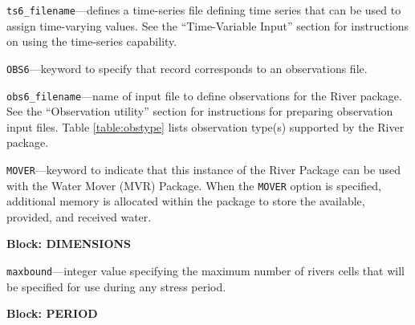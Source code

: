\begin{description}
\item \texttt{ts6\_filename}---defines a time-series file defining time series that can be used to assign time-varying values. See the ``Time-Variable Input'' section for instructions on using the time-series capability.

\item \texttt{OBS6}---keyword to specify that record corresponds to an observations file.

\item \texttt{obs6\_filename}---name of input file to define observations for the River package. See the ``Observation utility'' section for instructions for preparing observation input files. Table \ref{table:obstype} lists observation type(s) supported by the River package.

\item \texttt{MOVER}---keyword to indicate that this instance of the River Package can be used with the Water Mover (MVR) Package.  When the \texttt{MOVER} option is specified, additional memory is allocated within the package to store the available, provided, and received water.

\end{description}
\item \textbf{Block: DIMENSIONS}

\begin{description}
\item \texttt{maxbound}---integer value specifying the maximum number of rivers cells that will be specified for use during any stress period.

\end{description}
\item \textbf{Block: PERIOD}

